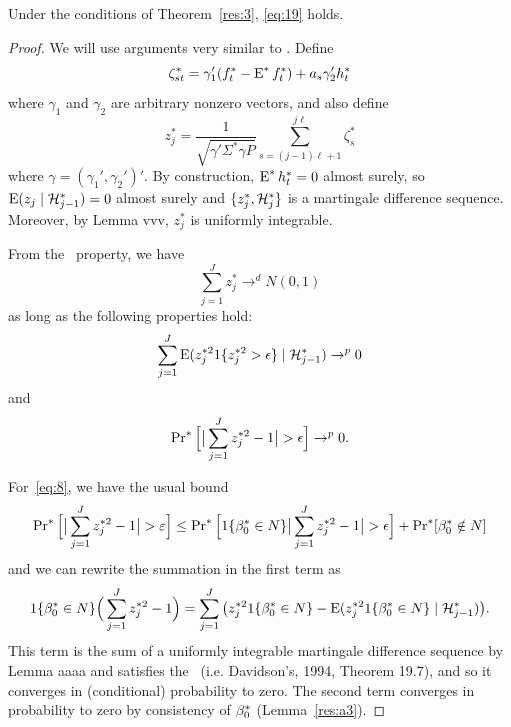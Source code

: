 \documentclass[12pt,fleqn]{article}
\begin{document}
\begin{lema}\label{lem-clt}
  Under the conditions of Theorem~\ref{res:3}, \eqref{eq:19} holds.
\end{lema}
\begin{proof}

  We will use arguments very similar to \cite{Cal:14}. Define
  \[
  \zeta_{st}^* = \gamma_1'(f_t^* - \operatorname{E}^* f_t^*) + a_s \gamma_2' h_t^*
  \]
  where $\gamma_1$ and $\gamma_2$ are arbitrary nonzero vectors, and
  also define
  \[
  z_j^* = \frac{1}{\sqrt{\gamma'\Sigma^*\gamma P}} \sum_{s=(j-1) \ell + 1}^{j\ell} \zeta_s^*
  \]
  where $\gamma = (\gamma_1', \gamma_2')'$. By construction, $\operatorname{E}^*
  h_t^* = 0$ almost surely, so $\operatorname{E}(z_j \mid \mathcal{H}_{j-1}^*) = 0$ almost
  surely and $\{z_j^*, \mathcal{H}_j^*\}$ is a martingale difference sequence.
  Moreover, by Lemma vvv, $z_j^*$ is uniformly integrable.

  From the \mds\ property, we have
  \begin{equation*}
    \sum_{j=1}^J z_j^* \to^d N(0, 1)
  \end{equation*}
  as long as the following properties hold:
  \begin{equation}\label{eq:7}
    \sum_{j=1}^J \operatorname{E}(z_j^{*2} 1\{z_j^{*2} > \epsilon\} \mid \mathcal{H}_{j-1}^*) \to^p 0
  \end{equation}
  and
  \begin{equation}\label{eq:8}
    \operatorname{Pr}^*\Big[ \big| \sum_{j=1}^J z_j^{*2} - 1 \big| > \epsilon\Big] \to^p 0.
  \end{equation}

  For~\eqref{eq:8}, we have the usual bound
  \begin{equation*}
    \operatorname{Pr}^*\Big[ \big|\sum_{j=1}^J z_j^{*2} - 1 \big| > \varepsilon\Big] \leq
    \operatorname{Pr}^*\Big[ 1\{\beta_0^* \in N\} \big| \sum_{j=1}^J z_j^{*2} - 1 \big| > \epsilon \Big]
     + \operatorname{Pr}^*[ \beta_0^* \notin N ]
  \end{equation*}
  and we can rewrite the summation in the first term as
  \begin{equation*}
    1\{\beta_0^* \in N\} \Big( \sum_{j=1}^J z_j^{*2} - 1 \Big)
    =  \sum_{j=1}^J \big(z_j^{*2}1\{\beta_0^* \in N\} - \operatorname{E}(z_j^{*2} 1\{\beta_0^* \in N\} \mid \mathcal{H}_{j-1}^*) \big).
   \end{equation*}
   This term is the sum of a uniformly integrable martingale
   difference sequence by Lemma aaaa and satisfies the \lln\
   (i.e. Davidson's, 1994, Theorem 19.7), and so it converges in
   (conditional) probability to zero.  The second term converges in
   probability to zero by consistency of $\beta_0^*$
   (Lemma~\ref{res:a3}).


\end{proof}
\end{document}
